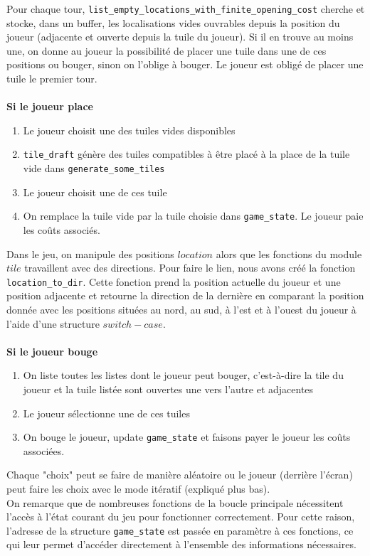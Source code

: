 Pour chaque tour, \texttt{list\_empty\_locations\_with\_finite\_opening\_cost} cherche et stocke, dans un buffer, les localisations vides ouvrables depuis la position du joueur (adjacente et ouverte depuis la tuile du joueur). Si il en trouve au moins une, on donne au joueur la possibilité de placer une tuile dans une de ces positions ou bouger, sinon on l'oblige à bouger. Le joueur est obligé de placer une tuile le premier tour.\\
\\
\textbf{Si le joueur place}
\begin{enumerate}
    \item Le joueur choisit une des tuiles vides disponibles
    \item \texttt{tile\_draft} génère des tuiles compatibles à être placé à la place de la tuile vide dans \texttt{generate\_some\_tiles}
    \item Le joueur choisit une de ces tuile
    \item On remplace la tuile vide par la tuile choisie dans \texttt{game\_state}. Le joueur paie les coûts associés.
\end{enumerate} 
Dans le jeu, on manipule des positions $location$ alors que les fonctions du module $tile$ travaillent avec des directions. Pour faire le lien, nous avons créé la fonction \texttt{location\_to\_dir}. Cette fonction prend la position actuelle du joueur et une position adjacente et retourne la direction de la dernière en comparant la position donnée avec les positions situées au nord, au sud, à l’est et à l’ouest du joueur à l’aide d’une structure $switch-case$.\\
\\
\textbf{Si le joueur bouge}
\begin{enumerate}
    \item On liste toutes les listes dont le joueur peut bouger, c'est-à-dire la tile du joueur et la tuile listée sont ouvertes une vers l'autre et adjacentes
    \item Le joueur sélectionne une de ces tuiles
    \item On bouge le joueur, update \texttt{game\_state} et faisons payer le joueur les coûts associées.
\end{enumerate} 


\vspace{0.9em}
Chaque "choix" peut se faire de manière aléatoire ou le joueur (derrière l'écran) peut faire les choix avec le mode itératif (expliqué plus bas).
\\
On remarque que de nombreuses fonctions de la boucle principale nécessitent l’accès à l’état courant du jeu pour fonctionner correctement. Pour cette raison, l’adresse de la structure \texttt{game\_state} est passée en paramètre à ces fonctions, ce qui leur permet d’accéder directement à l’ensemble des informations nécessaires.

